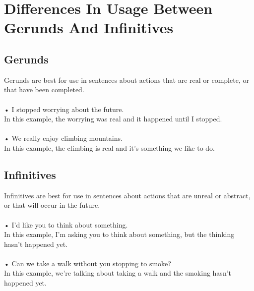 \chapter{Differences In Usage Between Gerunds And Infinitives}
\section{Gerunds}
Gerunds are best for use in sentences about actions that are real or complete, or that have been completed.\\\\
• I stopped worrying about the future.\\
In this example, the worrying was real and it happened until I stopped.\\\\
• We really enjoy climbing mountains.\\
In this example, the climbing is real and it’s something we like to do.

\section{Infinitives}
Infinitives are best for use in sentences about actions that are unreal or abstract, or that will occur in the future.\\\\
• I’d like you to think about something.\\
In this example, I’m asking you to think about something, but the thinking hasn’t happened yet.\\\\
• Can we take a walk without you stopping to smoke?\\
In this example, we’re talking about taking a walk and the smoking hasn’t happened yet.